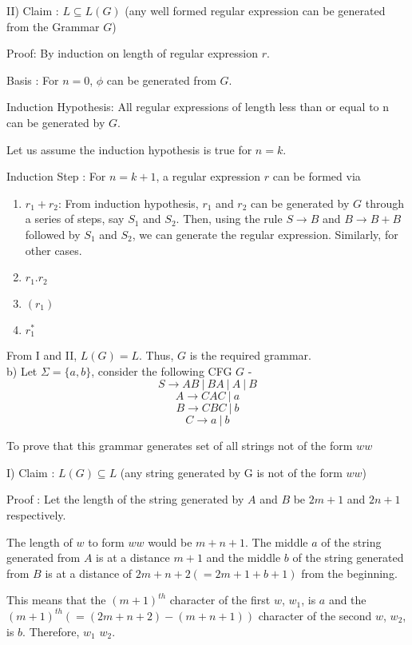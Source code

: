 \documentclass{article}
\begin{document}
    \quad II) Claim : $L \subseteq L(G) $ (any well formed regular expression can be generated from the Grammar $G$)
    
    \quad Proof: By induction on length of regular expression $r$.
    
    \quad Basis : For $n = 0$, $\phi$ can be generated from $G$.
    
    \quad Induction Hypothesis: All regular expressions of length less than or equal to n can be generated by $G$.
    
    \quad Let us assume the induction hypothesis is true for $n = k$.
    
    \quad Induction Step : For $n = k+1$, a regular expression $r$ can be formed via 
    \begin{enumerate}
        \item $r_1 + r_2$: From induction hypothesis, $r_1$ and $r_2$ can be generated by $G$ through a series of steps, say $S_1$ and $S_2$. Then, using the rule $S \rightarrow B$ and $B \rightarrow B + B$ followed by $S_1$ and $S_2$, we can generate the regular expression. Similarly, for other cases.
        \item $r_1 . r_2$
        \item $(r_1)$
        \item $r_1^*$
    \end{enumerate}
    
    \quad From I and II, $L(G) = L$. Thus, $G$ is the required grammar. \\
    
    b) Let $\Sigma = \{a,b\}$, consider the following CFG $G$ -
    $$S \rightarrow AB ~|~ BA ~|~ A ~|~ B$$
    $$A \rightarrow CAC ~|~ a  $$
    $$B \rightarrow CBC ~|~ b  $$
    $$C \rightarrow a ~|~ b  $$
    
    \quad To prove that this grammar generates set of all strings not of the form $ww$
    
    \quad I) Claim : $L(G) \subseteq L $ (any string generated by G is not of the form $ww$)
    
    \quad Proof : Let the length of the string generated by $A$ and $B$ be $2m+1$ and $2n+1$ respectively. 
    
    \quad The length of $w$ to form $ww$ would be $m+n+1$. The middle $a$ of the string generated from $A$ is at a distance $m+1$ and the middle $b$ of the string generated from $B$ is at a distance of $2m+n+2 (= 2m+1+b+1)$ from the beginning. 
    
    \quad This means that the $(m+1)^{th}$ character of the first $w$, $w_1$, is $a$ and the $(m+1)^{th} (=(2m+n+2)-(m+n+1))$ character of the second $w$, $w_2$, is $b$. Therefore, $w_1$ \ne $w_2$. 
    
\end{document}
